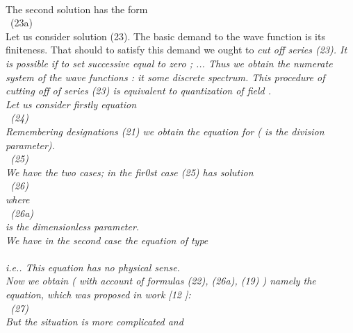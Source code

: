\documentclass[a4paper,12pt] {article}
\begin{document}
\\The second   solution has the form {\\\coordHE{} \ (23a)
\\ Let us consider solution (23). The basic demand to the  wave function is its finiteness. That should to
  satisfy this demand we ought to \it cut off  \rm series  (23). It is possible if  \it to set successive equal to
 zero
 \coordHE{}; \coordHE{}... \rm Thus we obtain the numerate system of the
wave functions : it  some discrete spectrum. \rm This procedure of cutting off of series (23) is equivalent
 to  \it quantization of field \myHighlight{$\Psi$}\coordHE{}.
\\  \rm Let us consider firstly equation \\\coordHE{} \ (24) \\ Remembering designations
(21) we  obtain the equation for \myHighlight{$\lambda$}\coordHE{} ( \myHighlight{$\lambda$}\coordHE{} is the division parameter).
\\\coordHE{} \ (25)
\\ We have the two cases; in the fir0st case  (25) has  solution
\\\coordHE{} \ (26)\\ where \\\coordHE{} \ (26a)
\\ is the dimensionless parameter.\\ We have in the second case the equation of type
\\\coordHE{}\\i.e.\myHighlight{$ \lambda \to \infty $}\coordHE{}. This equation has no physical sense.\\ Now we obtain ( with
 account of formulas (22), (26a), (19) )  \it namely the equation, which was proposed in work \rm [12
]:\\\coordHE{} \ (27)\\ But the situation is more complicated and
}
\end{document}
